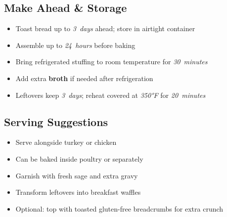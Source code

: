 \documentclass[11pt,letterpaper]{article}
\begin{document}
{\begin{multicols}{2}
\subsection*{Make Ahead \& Storage}
\begin{itemize}
    \item Toast bread up to \textit{3~days} ahead; store in airtight container
    \item Assemble up to \textit{24~hours} before baking
    \item Bring refrigerated stuffing to room temperature for \textit{30~minutes}
    \item Add extra \textbf{broth} if needed after refrigeration
    \item Leftovers keep \textit{3~days}; reheat covered at \textit{350°F} for \textit{20~minutes}
\end{itemize}

\subsection*{Serving Suggestions}
\begin{itemize}
    \item Serve alongside turkey or chicken
    \item Can be baked inside poultry or separately
    \item Garnish with fresh sage and extra gravy
    \item Transform leftovers into breakfast waffles
    \item Optional: top with toasted gluten-free breadcrumbs for extra crunch
\end{itemize}

\end{multicols}
}
\end{document}
